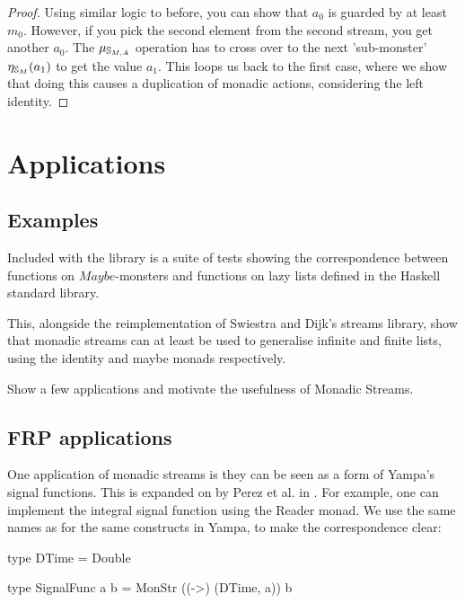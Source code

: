 \documentclass{article}
\begin{document}
\begin{proof}
Using similar logic to before, you can show that $a_0$ is guarded by at least $m_0$. However, if you pick the second element from the second stream, you get another $a_0$. The $\mu_{\mathbb{S}_{M,A}}$ operation has to cross over to the next 'sub-monster' $\eta_{\mathbb{S}_{M}}(a_1)$ to get the value $a_1$. This loops us back to the first case, where we show that doing this causes a duplication of monadic actions, considering the left identity. 

\end{proof}

\section{Applications}

\subsection{Examples}

Included with the library is a suite of tests showing the correspondence between functions on $Maybe$-monsters and functions on lazy lists defined in the Haskell standard library. 

This, alongside the reimplementation of Swiestra and Dijk's streams library, show that monadic streams can at least be used to generalise infinite and finite lists, using the identity and maybe monads respectively.

\begin{ccomment}
	Show a few applications and motivate the usefulness of Monadic Streams.
\end{ccomment}

\subsection{FRP applications}

One application of monadic streams is they can be seen as a form of Yampa's \cite{yampa_arcade} signal functions. This is expanded on by Perez et al. in \cite{frp_refactored}. For example, one can implement the integral signal function using the Reader monad. We use the same names as for the same constructs in Yampa, to make the correspondence clear:

\begin{haskell}
type DTime = Double

type SignalFunc a b = MonStr ((->) (DTime, a)) b
\end{haskell}
\end{document}
